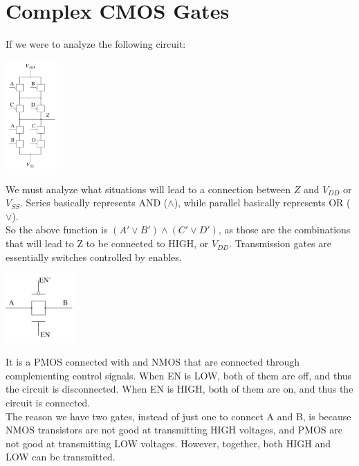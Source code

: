 \documentclass[nobib]{tufte-handout}
\begin{document}
    \section{Complex CMOS Gates}
    If we were to analyze the following circuit:
    \begin{center}
        \includegraphics[width = 75px]{images/complexcmos.png}
    \end{center}
    We must analyze what situations will lead to a connection between $Z$ and $V_{DD}$ or $V_{SS}$. Series basically represents AND ($\land$), while parallel basically represents OR ($\lor$).\\
    So the above function is $(A'\lor B')\land(C'\lor D')$, as those are the combinations that will lead to Z to be connected to HIGH, or $V_{DD}$.
Transmission gates are essentially switches controlled by enables.\\
\begin{center}
    \includegraphics[width = 100px]{images/transmission_gate.png}
\end{center}
It is a PMOS connected with and NMOS that are connected through complementing control signals. When EN is LOW, both of them are off, and thus the circuit is disconnected. When EN is HIGH, both of them are on, and thus the circuit is connected.\\
The reason we have two gates, instead of just one to connect A and B, is because NMOS transistors are not good at transmitting HIGH voltages, and PMOS are not good at transmitting LOW voltages. However, together, both HIGH and LOW can be transmitted.\\
\end{document}
